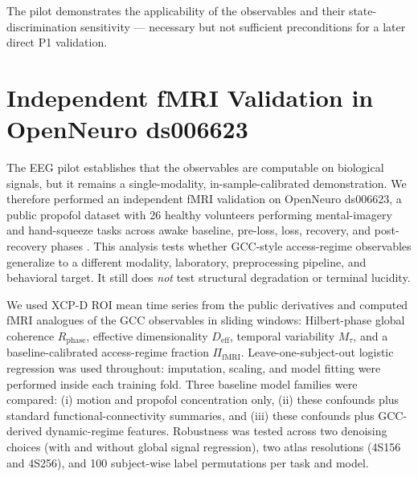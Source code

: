 \documentclass[11pt,a4paper]{article}
\theoremstyle{plain}
\theoremstyle{definition}
\theoremstyle{remark}
\begin{document}
The pilot demonstrates the applicability of the observables and their state-discrimination sensitivity --- necessary but not sufficient preconditions for a later direct P1 validation.


\section{Independent fMRI Validation in OpenNeuro ds006623}
\label{sec:fmri-validation}

The EEG pilot establishes that the observables are computable on biological signals, but it remains a single-modality, in-sample-calibrated demonstration. We therefore performed an independent fMRI validation on OpenNeuro ds006623, a public propofol dataset with 26 healthy volunteers performing mental-imagery and hand-squeeze tasks across awake baseline, pre-loss, loss, recovery, and post-recovery phases \citep{huang2026,huangopenneuro2025}. This analysis tests whether GCC-style access-regime observables generalize to a different modality, laboratory, preprocessing pipeline, and behavioral target. It still does \emph{not} test structural degradation or terminal lucidity.

We used XCP-D ROI mean time series from the public derivatives and computed fMRI analogues of the GCC observables in sliding windows: Hilbert-phase global coherence $R_{\mathrm{phase}}$, effective dimensionality $D_{\mathrm{eff}}$, temporal variability $M_\tau$, and a baseline-calibrated access-regime fraction $\Pi_{\mathrm{fMRI}}$. Leave-one-subject-out logistic regression was used throughout: imputation, scaling, and model fitting were performed inside each training fold. Three baseline model families were compared: (i) motion and propofol concentration only, (ii) these confounds plus standard functional-connectivity summaries, and (iii) these confounds plus GCC-derived dynamic-regime features. Robustness was tested across two denoising choices (with and without global signal regression), two atlas resolutions (4S156 and 4S256), and 100 subject-wise label permutations per task and model.
\end{document}
